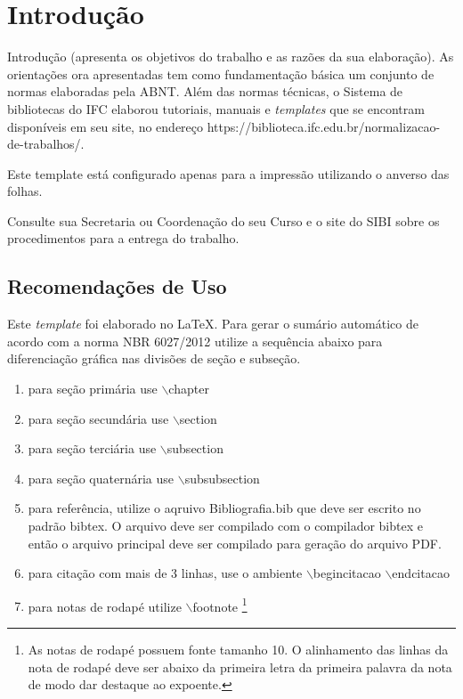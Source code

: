 \chapter{Introdução}

Introdução (apresenta os objetivos do trabalho e as razões da sua elaboração).
As orientações ora apresentadas tem como fundamentação básica um conjunto de normas elaboradas pela ABNT. Além das normas técnicas, o Sistema de bibliotecas do IFC elaborou tutoriais, manuais e \textit{templates} que se encontram disponíveis em seu site, no endereço https://biblioteca.ifc.edu.br/normalizacao-de-trabalhos/.

Este template está configurado apenas para a impressão utilizando o anverso das folhas.

Consulte sua Secretaria ou Coordenação do seu Curso e o site do SIBI sobre os procedimentos para a entrega do trabalho.

\section{Recomendações de Uso}
Este \textit{template} foi elaborado no \LaTeX . Para gerar o sumário automático de acordo com a norma NBR 6027/2012 utilize a sequência abaixo para diferenciação gráfica nas divisões de seção e subseção.

\begin{enumerate}[label=\alph*)]
   \item para seção primária use $\backslash$chapter
   \item para seção secundária use $\backslash$section
   \item para seção terciária use $\backslash$subsection
   \item para seção quaternária use $\backslash$subsubsection
   \item para referência, utilize o aqruivo Bibliografia.bib que deve ser escrito no padrão bibtex. O arquivo deve ser compilado com o compilador bibtex e então o arquivo principal deve ser compilado para geração do arquivo PDF.
   \item para citação com mais de 3 linhas, use o ambiente $\backslash$begin{citacao}  $\backslash${end{citacao}}
   \item para notas de rodapé utilize $\backslash$footnote \footnote{As notas de rodapé possuem fonte tamanho 10. O alinhamento das linhas da nota de rodapé deve ser abaixo da primeira letra da primeira palavra da nota de modo dar destaque ao expoente.}
\end{enumerate}

